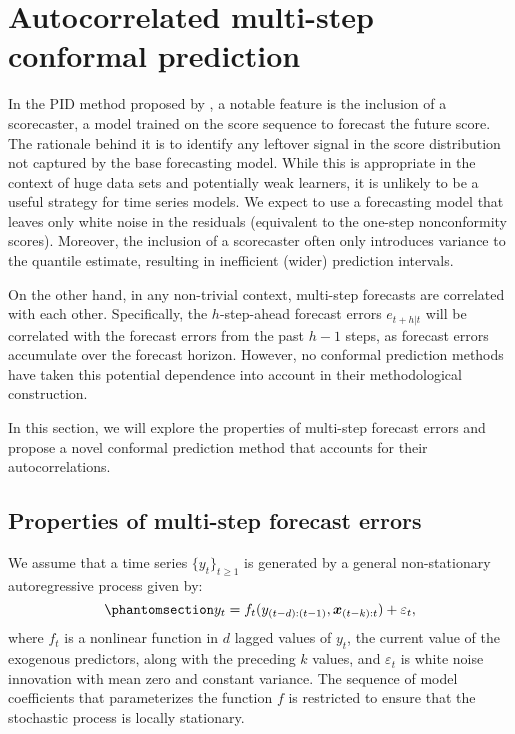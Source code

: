 \documentclass[
  11pt,
  12pt]{article}
\theoremstyle{plain}
\theoremstyle{remark}
\begin{document}
\section{Autocorrelated multi-step conformal
prediction}\label{sec-acmcp}

In the PID method proposed by \citet{angelopoulos2024}, a notable
feature is the inclusion of a scorecaster, a model trained on the score
sequence to forecast the future score. The rationale behind it is to
identify any leftover signal in the score distribution not captured by
the base forecasting model. While this is appropriate in the context of
huge data sets and potentially weak learners, it is unlikely to be a
useful strategy for time series models. We expect to use a forecasting
model that leaves only white noise in the residuals (equivalent to the
one-step nonconformity scores). Moreover, the inclusion of a scorecaster
often only introduces variance to the quantile estimate, resulting in
inefficient (wider) prediction intervals.

On the other hand, in any non-trivial context, multi-step forecasts are
correlated with each other. Specifically, the \(h\)-step-ahead forecast
errors \(e_{t+h|t}\) will be correlated with the forecast errors from
the past \(h-1\) steps, as forecast errors accumulate over the forecast
horizon. However, no conformal prediction methods have taken this
potential dependence into account in their methodological construction.

In this section, we will explore the properties of multi-step forecast
errors and propose a novel conformal prediction method that accounts for
their autocorrelations.

\subsection{Properties of multi-step forecast errors}\label{sec-ppt}

We assume that a time series \(\{y_t\}_{t \geq 1}\) is generated by a
general non-stationary autoregressive process given by:
\begin{equation}\phantomsection\label{eq-dgp}{
y_t = f_{t}(y_{(t-d):(t-1)},\bm{x}_{(t-k):t}) + \varepsilon_t,
}\end{equation} where \(f_{t}\) is a nonlinear function in \(d\) lagged
values of \(y_t\), the current value of the exogenous predictors, along
with the preceding \(k\) values, and \(\varepsilon_t\) is white noise
innovation with mean zero and constant variance. The sequence of model
coefficients that parameterizes the function \(f\) is restricted to
ensure that the stochastic process is locally stationary.
\end{document}

